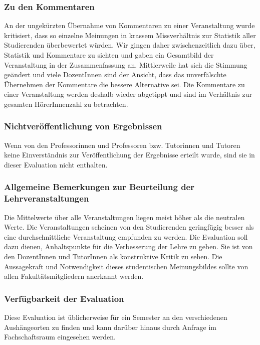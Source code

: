 \subsubsection{Zu den Kommentaren}

An der ungekürzten Übernahme von Kommentaren zu einer Veranstaltung wurde kritisiert, dass so einzelne Meinungen in krassem Missverhältnis zur Statistik aller Studierenden überbewertet würden. Wir gingen daher zwischenzeitlich dazu über, Statistik und Kommentare zu sichten und gaben ein Gesamtbild der Veranstaltung in der Zusammenfassung an. Mittlerweile hat sich die Stimmung geändert und viele DozentInnen sind der Ansicht, dass das unverfälschte Übernehmen der Kommentare die bessere Alternative sei. Die Kommentare zu einer Veranstaltung werden deshalb wieder abgetippt und sind im Verhältnis zur gesamten HörerInnenzahl zu betrachten.

\subsubsection{Nichtveröffentlichung von Ergebnissen}
Wenn von den Professorinnen und Professoren bzw. Tutorinnen und Tutoren keine Einverständnis zur Veröffentlichung der Ergebnisse erteilt wurde, sind sie in dieser Evaluation nicht enthalten. 

\subsubsection{Allgemeine Bemerkungen zur Beurteilung der Lehrveranstaltungen}

Die Mittelwerte über alle Veranstaltungen liegen meist höher als die neutralen Werte. Die Veranstaltungen scheinen von den Studierenden geringfügig besser als eine durchschnittliche Veranstaltung empfunden zu werden. Die Evaluation soll dazu dienen, Anhaltspunkte für die Verbesserung der Lehre zu geben. Sie ist von den DozentInnen und TutorInnen als konstruktive Kritik zu sehen. Die Aussagekraft und Notwendigkeit dieses studentischen Meinungsbildes sollte von allen Fakultätsmitgliedern anerkannt werden.

\subsubsection{Verfügbarkeit der Evaluation}

Diese Evaluation ist üblicherweise für ein Semester an den verschiedenen Aushängeorten zu finden und kann darüber hinaus durch Anfrage im Fachschaftsraum eingesehen werden.

